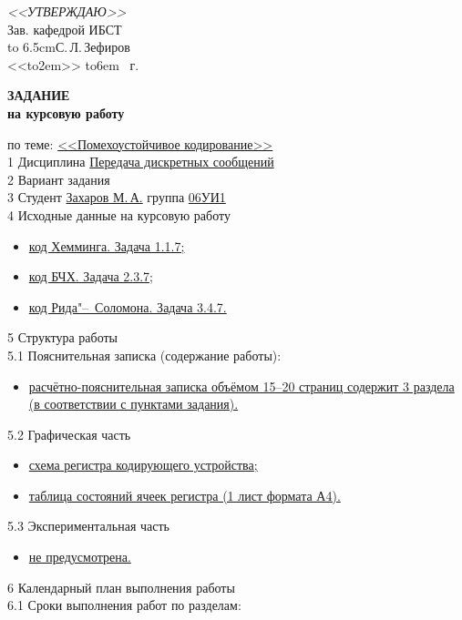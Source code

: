 \hfill\parbox{6.5cm}{
	\textit{<<УТВЕРЖДАЮ>>}\\
	Зав. кафедрой ИБСТ\\
	\hbox to 6.5cm{\hrulefill С.\,Л.\,Зефиров}\\
	\def\hrf#1{\hbox to#1{\hrulefill}}
	<<\hrf{2em}>> \hrf{6em} \the\year~г.}	
	
      \begin{center}\textbf{\normalfont\bfseries\large ЗАДАНИЕ}\\\textbf{на
        курсовую работу}\end{center}

\noindent по теме: \uline{<<Помехоустойчивое кодирование>>\hfill}\\
1 Дисциплина \uline{\qquad Передача дискретных сообщений\hfill}\\
2 Вариант задания \uline{\hfill}\\
3 Студент \uline{\qquad Захаров М.\,А.\qquad } группа \uline{\qquad 06УИ1\hfill}\\
4 Исходные данные на курсовую работу
\begin{itemize}
\item \uline{код Хемминга. Задача 1.1.7;\hfill\quad}
\item \uline{код БЧХ. Задача 2.3.7;\hfill\quad}
\item \uline{код Рида"--~Соломона. Задача 3.4.7.\hfill\quad}
\end{itemize}
5 Структура работы\\
5.1 Пояснительная записка (содержание работы):
\begin{itemize}
\item \uline{расчётно-пояснительная записка объёмом 15--20 страниц
    со\-держит 3 раздела (в соответствии с пунктами
    задания). \hfill \quad}
\end{itemize}
5.2 Графическая часть
\begin{itemize}
\item \uline{схема регистра кодирующего устройства;\hfill}
\item \uline{таблица состояний ячеек регистра (1 лист формата А4).\hfill}
\end{itemize}
5.3 Экспериментальная часть
\begin{itemize}
\item \uline{не предусмотрена.\hfill}
\end{itemize}
6 Календарный план выполнения работы\\
6.1 Сроки выполнения работ по разделам:
